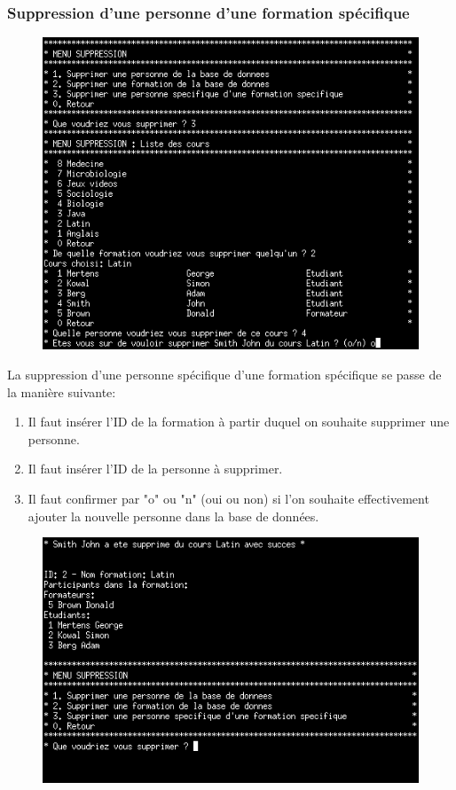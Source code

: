 \documentclass[11pt]{article}
\begin{document}
\newpage
\subsubsection{Suppression d'une personne d'une formation spécifique}
\begin{figure}[ht]
  \centering
  \includegraphics[trim=0 0 0 0, clip, width=\textwidth]{images/19.png}
\end{figure}
La suppression d'une personne spécifique d'une formation spécifique se passe de la manière suivante:
\begin{enumerate}
\item Il faut insérer l'ID de la formation à partir duquel on souhaite supprimer une personne.
\item Il faut insérer l'ID de la personne à supprimer.
\item Il faut confirmer par "o" ou "n" (oui ou non) si l'on souhaite effectivement ajouter la nouvelle personne dans la base de données.
\end{enumerate}

\newpage
\begin{figure}[ht]
  \centering
  \includegraphics[trim=0 30 0 0, clip, width=\textwidth]{images/20.png}
\end{figure}
\end{document}
